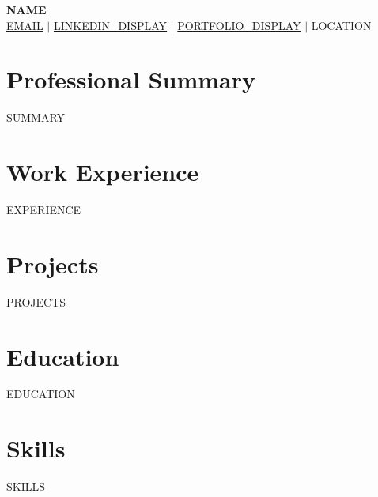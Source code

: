\documentclass[letterpaper,11pt]{article}
\newcommand{\resumeSubHeadingListStart}{\begin{itemize}[leftmargin=0.15in, label={}]}
\newcommand{\resumeSubHeadingListEnd}{\end{itemize}}
\begin{document}
\begin{center}
  \textbf{\Huge \scshape {{NAME}}} \\ \vspace{1pt}
  \small
  \href{mailto:{{EMAIL}}}{{{EMAIL}}} $|$
  \href{{{LINKEDIN_URL}}}{{{LINKEDIN_DISPLAY}}} $|$
  \href{{{PORTFOLIO_URL}}}{{{PORTFOLIO_DISPLAY}}} $|$
  {{LOCATION}}
\end{center}

\section{Professional Summary}
\small{{SUMMARY}}

\section{Work Experience}
  \resumeSubHeadingListStart
{{EXPERIENCE}}
  \resumeSubHeadingListEnd

\section{Projects}
  \resumeSubHeadingListStart
{{PROJECTS}}
  \resumeSubHeadingListEnd

\section{Education}
  \resumeSubHeadingListStart
{{EDUCATION}}
  \resumeSubHeadingListEnd

\section{Skills}
 \begin{itemize}[leftmargin=0.15in, label={}]
  \small{\item{
{{SKILLS}}
  }}
 \end{itemize}
\end{document}
